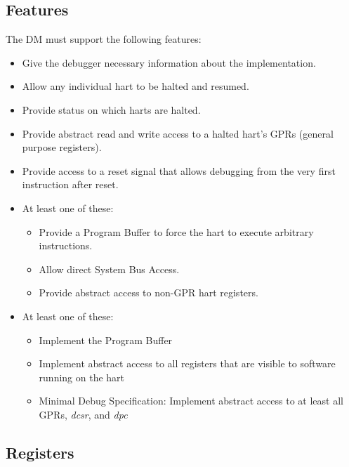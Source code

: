 \documentclass{article}
\begin{document}
	\subsection{Features}
	
	The DM must support the following features:
	
	\begin{itemize}
	
	\item Give the debugger necessary information about the implementation.
	
	\item Allow any individual hart to be halted and resumed.
	
	\item Provide status on which harts are halted.
	
	\item Provide abstract read and write access to a halted hart’s GPRs (general purpose registers).
	
	\item Provide access to a reset signal that allows debugging from the very first instruction after reset.
	
	\item At least one of these:
		\begin{itemize}
		\item Provide a Program Buffer to force the hart to execute arbitrary instructions.
		\item Allow direct System Bus Access.
		\item Provide abstract access to non-GPR hart registers.
		\end{itemize}
	
	\item At least one of these:
		\begin{itemize}
		\item Implement the Program Buffer
		\item Implement abstract access to all registers that are visible to software running on the hart
		\item Minimal Debug Specification: Implement abstract access to at least all GPRs, \textit{dcsr}, and \textit{dpc}
		\end{itemize}
	
	\end{itemize}
	
	\subsection{Registers}
	
\end{document}
